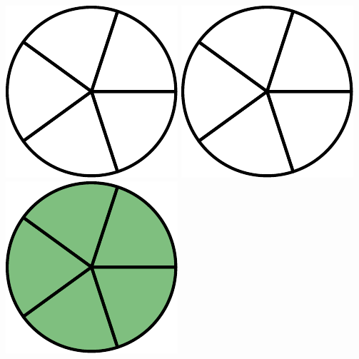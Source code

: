 \begin{center}
	\underline{}	\includegraphics[]{brokintro5a}\quad
	\includegraphics[]{brokintro5a}\quad
	\includegraphics[]{brokintro5b}
\end{center}
\vspace{20pt}
